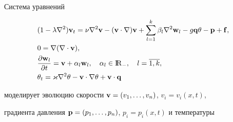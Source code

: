 \date{}




\pagestyle{plain} %







\maketitle


\label{begin}








Система уравнений


\begin{equation}


\begin{split}


&(1- \lambda {\nabla}^2){\bold v}_t=


\nu {\nabla}^2{\bold v}-({\bold v} \cdot \nabla){\bold v}+


\sum_{l=1}^{k} \beta_l {\nabla}^2 {\bold w}_l


- g {\bold q} \theta -{\bold p}+{\bold f},\\


%


&0=\nabla (\nabla \cdot {\bold v}),\\


%


&\frac{\partial {\bold w}_l}{\partial t}=


{\bold v}+{\alpha}_l {\bold w}_l,\quad


{\alpha}_l \in {\R}_-,\quad l=\overline {1,k},\\


%


&{\theta}_t=


\varkappa {\nabla}^2 \theta -{\bold v} \cdot \nabla \theta+{\bold v} \cdot


{\bold q}


\end{split}


\end{equation}


моделирует эволюцию скорости ${\bold v}=(v_1,\dotsc,v_n)$, $v_i=v_i(x,t)$,


градиента давления ${\bold p}=(p_1,\dotsc,p_n)$, $p_i=p_i(x,t)$ и температуры


